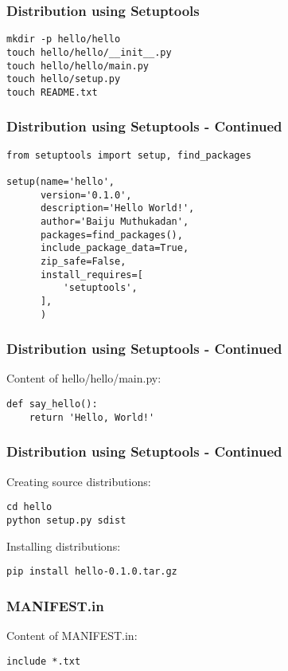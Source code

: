 \documentclass[12pt,handout]{beamer}
\begin{document}
\begin{frame}[fragile]
\frametitle{Distribution using Setuptools}

\small{
\begin{verbatim}
mkdir -p hello/hello
touch hello/hello/__init__.py
touch hello/hello/main.py
touch hello/setup.py
touch README.txt
\end{verbatim}
}
\end{frame}

\begin{frame}[fragile]
\frametitle{Distribution using Setuptools - Continued}
\small{
\begin{verbatim}
from setuptools import setup, find_packages

setup(name='hello',
      version='0.1.0',
      description='Hello World!',
      author='Baiju Muthukadan',
      packages=find_packages(),
      include_package_data=True,
      zip_safe=False,
      install_requires=[
          'setuptools',
      ],
      )
\end{verbatim}
}
\end{frame}

\begin{frame}[fragile]
\frametitle{Distribution using Setuptools - Continued}

Content of hello/hello/main.py:

\small{
\begin{verbatim}
def say_hello():
    return 'Hello, World!'
\end{verbatim}
}

\end{frame}

\begin{frame}[fragile]
\frametitle{Distribution using Setuptools - Continued}

Creating source distributions:

\small{
\begin{verbatim}
cd hello
python setup.py sdist
\end{verbatim}
}

Installing distributions:

\small{
\begin{verbatim}
pip install hello-0.1.0.tar.gz
\end{verbatim}
}

\end{frame}

\begin{frame}[fragile]
\frametitle{MANIFEST.in}

Content of MANIFEST.in:

\small{
\begin{verbatim}
include *.txt
\end{verbatim}
}

\end{frame}
\end{document}

